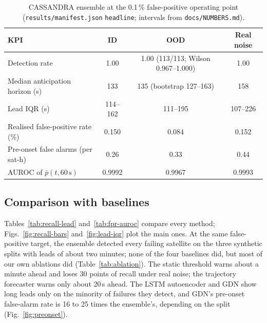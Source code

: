 \documentclass[10pt,a4paper]{article}
\newcommand{\file}[1]{\texttt{#1}}
\begin{document}
\begin{table}[ht]
\centering
\caption{CASSANDRA ensemble at the 0.1\,\% false-positive operating point
(\file{results/manifest.json} \texttt{headline}; intervals from \file{docs/NUMBERS.md}).}
\label{tab:headline}
\small
\begin{tabular}{@{}lccc@{}}
\toprule
KPI & ID & OOD & Real noise \\
\midrule
Detection rate & 1.00 & 1.00 (113/113; Wilson 0.967--1.000) & 1.00 \\
Median anticipation horizon (s) & 133 & 135 (bootstrap 127--163) & 158 \\
Lead IQR (s) & 114--162 & 111--195 & 107--226 \\
Realised false-positive rate (\%) & 0.150 & 0.084 & 0.152 \\
Pre-onset false alarms (per sat-h) & 0.26 & 0.33 & 0.44 \\
AUROC of $\bar p(t,60\,\mathrm{s})$ & 0.9992 & 0.9967 & 0.9993 \\
\bottomrule
\end{tabular}
\end{table}

\subsection{Comparison with baselines}
Tables~\ref{tab:recall-lead} and~\ref{tab:fpr-auroc} compare every method; Figs.~\ref{fig:recall-bars}
and~\ref{fig:lead-iqr} plot the main ones. At the same false-positive target, the ensemble detected every
failing satellite on the three synthetic splits with leads of about two minutes; none of the four
baselines did, but most of our own ablations did (Table~\ref{tab:ablation}).
The static threshold warns about a minute ahead and loses 30 points of recall under real noise; the
trajectory forecaster warns only about 20\,s ahead. The LSTM autoencoder and GDN show long leads only
on the minority of failures they detect, and GDN's pre-onset false-alarm rate is 16 to 25 times the
ensemble's, depending on the split (Fig.~\ref{fig:preonset}).
\end{document}
